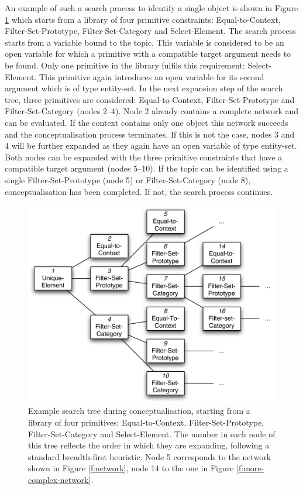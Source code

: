 An example of such a search process to identify a single object is
shown in Figure \ref{f:conceptualisation} which starts from a library
of four primitive constraints: {\sc Equal-to-Context}, {\sc
  Filter-Set-Prototype}, {\sc Filter-Set-Category} and {\sc
  Select-Element}. The search process starts from a variable bound to
the topic. This variable is considered to be an open variable for
which a primitive with a compatible target argument needs to be
found. Only one primitive in the library fulfils this requirement:
{\sc Select-Element}. This primitive again introduces an open variable
for its second argument which is of type entity-set. In the next
expansion step of the search tree, three primitives are considered:
{\sc Equal-to-Context}, {\sc Filter-Set-Prototype} and {\sc
  Filter-Set-Category} (nodes 2--4). Node 2 already contains a complete
network and can be evaluated. If the context contains only one object
this network succeeds and the conceptualisation process terminates. If
this is not the case, nodes 3 and 4 will be further expanded as they
again have an open variable of type entity-set. Both nodes can be
expanded with the three primitive constraints that have a compatible
target argument (nodes 5--10). If the topic can be identified using a
single {\sc Filter-Set-Prototype} (node 5) or {\sc
  Filter-Set-Category} (node 8), conceptualisation has been
completed. If not, the search process continues.

\begin{figure}
  \begin{center}
    \includegraphics[width=.75\textwidth]{./frameworks/figures/conceptualisation.pdf}
    \caption[Example of the conceptualisation process]{Example search
      tree during conceptualisation, starting from a library of four
      primitives: {\sc Equal-to-Context}, {\sc Filter-Set-Prototype},
      {\sc Filter-Set-Category} and {\sc Select-Element}. The number
      in each node of this tree reflects the order in which they are
      expanding, following a standard breadth-first heuristic. Node 5
      corresponds to the network shown in Figure \ref{f:network}, node
      14 to the one in Figure \ref{f:more-complex-network}.}
    \label{f:conceptualisation}
  \end{center}
\end{figure}

